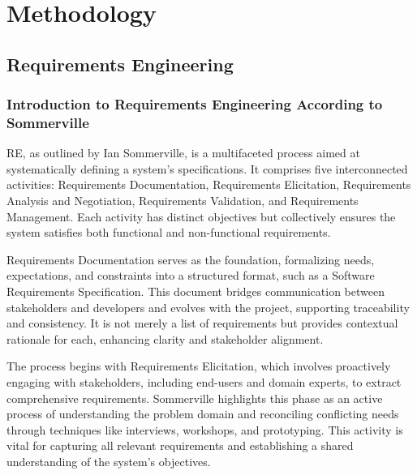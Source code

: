 \newpage


\section{Methodology}\label{sec:methodology}

\subsection{Requirements Engineering}\label{subsec:requirements-engineering}

\subsubsection{Introduction to Requirements Engineering According to Sommerville}

\ac{RE}, as outlined by Ian Sommerville, is a multifaceted process aimed at systematically defining a
system’s specifications. \autocite[cf.][p.5]{sommervilleRequirementsEngineeringGood1997} It comprises five
interconnected activities: Requirements Documentation, Requirements Elicitation, Requirements Analysis and Negotiation,
Requirements Validation, and Requirements Management.\autocite[cf.][p.11]{sommervilleRequirementsEngineeringGood1997}
Each activity has distinct objectives but collectively ensures the system satisfies both functional and non-functional
requirements.\autocite[cf.][p.7--8]{sommervilleRequirementsEngineeringGood1997}

Requirements Documentation serves as the foundation, formalizing needs, expectations, and constraints into a structured
format, such as a Software Requirements Specification. This document bridges communication between stakeholders
and developers and evolves with the project, supporting traceability and consistency. It is not merely a list of
requirements but provides contextual rationale for each, enhancing clarity and stakeholder alignment.
\autocite[cf.][38--40]{sommervilleRequirementsEngineeringGood1997}

The process begins with Requirements Elicitation, which involves proactively engaging with stakeholders, including
end-users and domain experts, to extract comprehensive requirements. Sommerville highlights this phase as an active
process of understanding the problem domain and reconciling conflicting needs through techniques like interviews,
workshops, and prototyping. This activity is vital for capturing all relevant requirements and establishing a shared
understanding of the system’s objectives.\autocite[cf.][p.64--65]{sommervilleRequirementsEngineeringGood1997}

